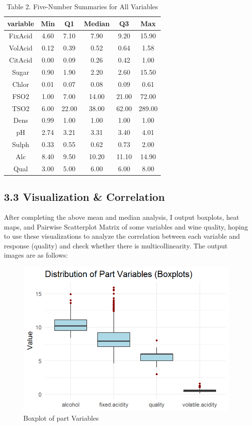 \documentclass[
  doc,floatsintext]{apa6}
\begin{document}
\begin{table}[!h]
\centering
\caption{\label{tab:five-num}Table 2. Five-Number Summaries for All Variables}
\centering
\begin{tabular}[t]{c|c|c|c|c|c}
\hline
variable & Min & Q1 & Median & Q3 & Max\\
\hline
FixAcid & 4.60 & 7.10 & 7.90 & 9.20 & 15.90\\
\hline
VolAcid & 0.12 & 0.39 & 0.52 & 0.64 & 1.58\\
\hline
CitAcid & 0.00 & 0.09 & 0.26 & 0.42 & 1.00\\
\hline
Sugar & 0.90 & 1.90 & 2.20 & 2.60 & 15.50\\
\hline
Chlor & 0.01 & 0.07 & 0.08 & 0.09 & 0.61\\
\hline
FSO2 & 1.00 & 7.00 & 14.00 & 21.00 & 72.00\\
\hline
TSO2 & 6.00 & 22.00 & 38.00 & 62.00 & 289.00\\
\hline
Dens & 0.99 & 1.00 & 1.00 & 1.00 & 1.00\\
\hline
pH & 2.74 & 3.21 & 3.31 & 3.40 & 4.01\\
\hline
Sulph & 0.33 & 0.55 & 0.62 & 0.73 & 2.00\\
\hline
Alc & 8.40 & 9.50 & 10.20 & 11.10 & 14.90\\
\hline
Qual & 3.00 & 5.00 & 6.00 & 6.00 & 8.00\\
\hline
\end{tabular}
\end{table}

\subsection{3.3 Visualization \& Correlation}\label{visualization-correlation}

After completing the above mean and median analysis, I output boxplots, heat maps, and Pairwise Scatterplot Matrix of some variables and wine quality, hoping to use these visualizations to analyze the correlation between each variable and response (quality) and check whether there is multicollinearity. The output images are as follows:

\begin{figure}[H]

{\centering \includegraphics[width=0.5\linewidth]{../plots/bp1} 

}

\caption{Boxplot of part Variables}\label{fig:fig-box}
\end{figure}
\end{document}
